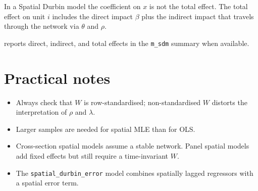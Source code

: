 In a Spatial Durbin model the coefficient on $x$ is not the total effect.
The total effect on unit $i$ includes the direct impact $\beta$ plus the
indirect impact that travels through the network via $\theta$ and $\rho$.

\hayashi{} reports direct, indirect, and total effects in the \texttt{m\_sdm}
summary when available.

\section{Practical notes}

\begin{itemize}
\item Always check that $W$ is row-standardised; non-standardised $W$
      distorts the interpretation of $\rho$ and $\lambda$.
\item Larger samples are needed for spatial MLE than for OLS.
\item Cross-section spatial models assume a stable network. Panel spatial
      models add fixed effects but still require a time-invariant $W$.
\item The \texttt{spatial\_durbin\_error} model combines spatially lagged
      regressors with a spatial error term.
\end{itemize}

